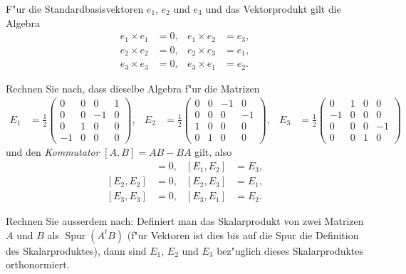 F"ur die Standardbasisvektoren $e_1$, $e_2$ und $e_3$ und das Vektorprodukt
gilt die Algebra
\begin{align*}
e_1\times e_1&=0,&
e_1\times e_2&=e_3,\\
e_2\times e_2&=0,&
e_2\times e_3&=e_1,\\
e_3\times e_3&=0,&
e_3\times e_1&=e_2.
\end{align*}
\begin{teilaufgaben}
\item
Rechnen Sie nach, dass dieselbe Algebra f"ur die Matrizen
\begin{align*}
E_1&=\frac12\begin{pmatrix}
 0& 0& 0& 1\\
 0& 0&-1& 0\\
 0& 1& 0& 0\\
-1& 0& 0& 0
\end{pmatrix},
&
E_2&=\frac12\begin{pmatrix}
 0& 0&-1& 0\\
 0& 0& 0&-1\\
 1& 0& 0& 0\\
 0& 1& 0& 0
\end{pmatrix},
&
E_3&=\frac12\begin{pmatrix}
 0& 1& 0& 0\\
-1& 0& 0& 0\\
 0& 0& 0&-1\\
 0& 0& 1& 0
\end{pmatrix}
&
\end{align*}
und den {\em Kommutator} $[A,B]=AB-BA$ gilt, also
\begin{align*}
[E_1, E_1]&=0,&
[E_1, E_2]&=E_3,\\
[E_2, E_2]&=0,&
[E_2, E_3]&=E_1,\\
[E_3, E_3]&=0,&
[E_3, E_1]&=E_2.
\end{align*}
\item
Rechnen Sie ausserdem nach:
Definiert man das Skalarprodukt von zwei Matrizen $A$ und $B$ als
$\operatorname{Spur}(A^tB)$
(f"ur Vektoren ist dies bis auf die Spur die Definition des Skalarproduktes),
dann sind $E_1$, $E_2$
und $E_3$ bez"uglich dieses Skalarproduktes orthonormiert.
\end{teilaufgaben}

